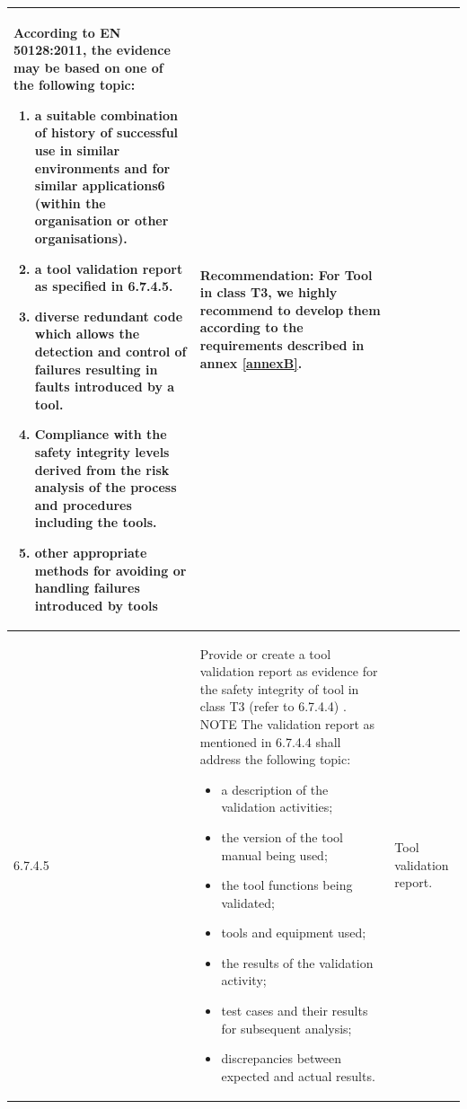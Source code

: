 \documentclass{template/openetcs_report}
\begin{document}
{\begin{longtable}{|p{2cm}|p{9cm}|p{3cm}|}
According to EN 50128:2011, the evidence may be based on one of the following topic:
\begin{enumerate}\itemsep=0pt
  \item a suitable combination of history of successful use in similar environments and for similar applications6 (within the organisation or other organisations).
  \item a tool validation report as specified in 6.7.4.5.
  \item diverse redundant code which allows the detection and control of failures resulting in faults introduced by a tool.
  \item Compliance with the safety integrity levels derived from the risk analysis of the process and procedures including the tools.
  \item other appropriate methods for avoiding or handling failures introduced by tools
\end{enumerate}
& \textbf{Recommendation:} \linebreak
\linebreak
\textbf{For Tool in class T3, we highly recommend to develop them according to the requirements described in annex \ref{annexB}.}\\ 
\hline
6.7.4.5 & Provide or create a tool validation report as evidence for the safety integrity of tool in class T3 (refer to 6.7.4.4) .
\linebreak
\linebreak
NOTE \linebreak
The validation report as mentioned in 6.7.4.4 shall address the following topic:
\begin{itemize}\itemsep=0pt
  \item a description of the validation activities;
  \item the version of the tool manual being used;
  \item the tool functions being validated;
  \item tools and equipment used;
  \item the results of the validation activity;
  \item test cases and their results for subsequent analysis;
  \item discrepancies between expected and actual results.
\end{itemize}
& Tool validation report.\\ 
\hline
\end{longtable}}
\end{document}
